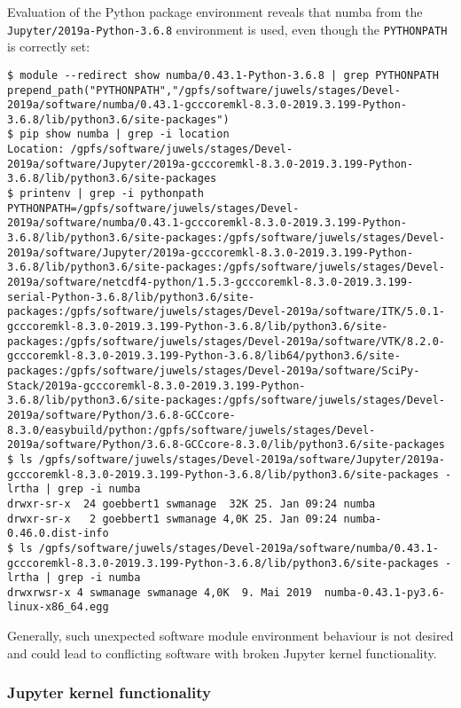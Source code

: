 Evaluation of the Python package environment reveals that numba from the \verb|Jupyter/2019a-Python-3.6.8| environment is used, even though the \verb|PYTHONPATH| is correctly set:
%
\begin{verbatim}
$ module --redirect show numba/0.43.1-Python-3.6.8 | grep PYTHONPATH
prepend_path("PYTHONPATH","/gpfs/software/juwels/stages/Devel-2019a/software/numba/0.43.1-gcccoremkl-8.3.0-2019.3.199-Python-3.6.8/lib/python3.6/site-packages")
$ pip show numba | grep -i location
Location: /gpfs/software/juwels/stages/Devel-2019a/software/Jupyter/2019a-gcccoremkl-8.3.0-2019.3.199-Python-3.6.8/lib/python3.6/site-packages
$ printenv | grep -i pythonpath
PYTHONPATH=/gpfs/software/juwels/stages/Devel-2019a/software/numba/0.43.1-gcccoremkl-8.3.0-2019.3.199-Python-3.6.8/lib/python3.6/site-packages:/gpfs/software/juwels/stages/Devel-2019a/software/Jupyter/2019a-gcccoremkl-8.3.0-2019.3.199-Python-3.6.8/lib/python3.6/site-packages:/gpfs/software/juwels/stages/Devel-2019a/software/netcdf4-python/1.5.3-gcccoremkl-8.3.0-2019.3.199-serial-Python-3.6.8/lib/python3.6/site-packages:/gpfs/software/juwels/stages/Devel-2019a/software/ITK/5.0.1-gcccoremkl-8.3.0-2019.3.199-Python-3.6.8/lib/python3.6/site-packages:/gpfs/software/juwels/stages/Devel-2019a/software/VTK/8.2.0-gcccoremkl-8.3.0-2019.3.199-Python-3.6.8/lib64/python3.6/site-packages:/gpfs/software/juwels/stages/Devel-2019a/software/SciPy-Stack/2019a-gcccoremkl-8.3.0-2019.3.199-Python-3.6.8/lib/python3.6/site-packages:/gpfs/software/juwels/stages/Devel-2019a/software/Python/3.6.8-GCCcore-8.3.0/easybuild/python:/gpfs/software/juwels/stages/Devel-2019a/software/Python/3.6.8-GCCcore-8.3.0/lib/python3.6/site-packages
$ ls /gpfs/software/juwels/stages/Devel-2019a/software/Jupyter/2019a-gcccoremkl-8.3.0-2019.3.199-Python-3.6.8/lib/python3.6/site-packages -lrtha | grep -i numba
drwxr-sr-x  24 goebbert1 swmanage  32K 25. Jan 09:24 numba
drwxr-sr-x   2 goebbert1 swmanage 4,0K 25. Jan 09:24 numba-0.46.0.dist-info
$ ls /gpfs/software/juwels/stages/Devel-2019a/software/numba/0.43.1-gcccoremkl-8.3.0-2019.3.199-Python-3.6.8/lib/python3.6/site-packages -lrtha | grep -i numba
drwxrwsr-x 4 swmanage swmanage 4,0K  9. Mai 2019  numba-0.43.1-py3.6-linux-x86_64.egg
\end{verbatim}

Generally, such unexpected software module environment behaviour is not desired and could lead to conflicting software with broken Jupyter kernel functionality.

\subsubsection{Jupyter kernel functionality}


